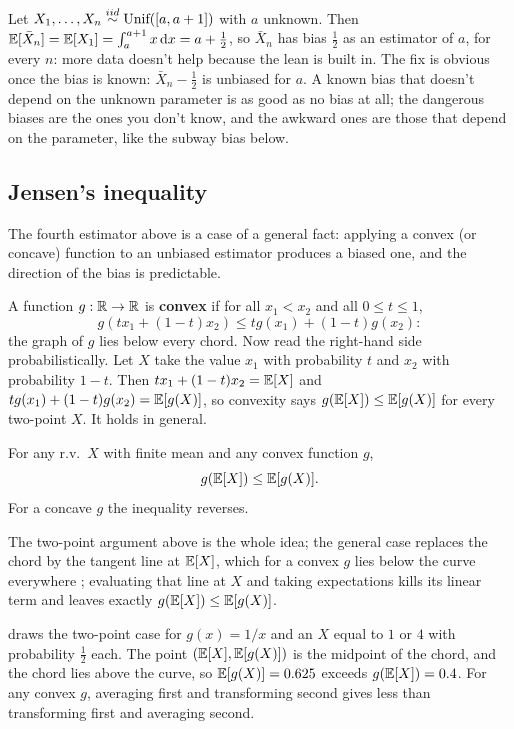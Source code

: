 \begin{worked}
Let $X_1, \ldots, X_n \stackrel{iid}{\sim} \text{Unif}([a, a+1])$ with $a$ unknown.
Then $\operatorname*{\mathbb{E}}[\bar{X}_n] = \operatorname*{\mathbb{E}}[X_1] = \int_a^{a+1} x \, \mathrm{d}x = a + \frac12$, so $\bar{X}_n$ has bias $\frac12$ as an estimator of $a$, for every $n$: more data doesn't help because the lean is built in.
The fix is obvious once the bias is known: $\bar{X}_n - \frac12$ is unbiased for $a$.
A known bias that doesn't depend on the unknown parameter is as good as no bias at all; the dangerous biases are the ones you don't know, and the awkward ones are those that depend on the parameter, like the subway bias below.
\end{worked}

\subsection{Jensen's inequality}

The fourth estimator above is a case of a general fact: applying a convex (or concave) function to an unbiased estimator produces a biased one, and the direction of the bias is predictable.

A function $g: \mathbb{R} \to \mathbb{R}$ is \textbf{convex} if for all $x_1 < x_2$ and all $0 \leq t \leq 1$,
\[
g(t x_1 + (1 - t) x_2) \leq t g(x_1) + (1 - t) g(x_2):
\]
the graph of $g$ lies below every chord.
Now read the right-hand side probabilistically.
Let $X$ take the value $x_1$ with probability $t$ and $x_2$ with probability $1 - t$.
Then $t x_1 + (1-t) x_2 = \operatorname*{\mathbb{E}}[X]$ and $t g(x_1) + (1-t) g(x_2) = \operatorname*{\mathbb{E}}[g(X)]$, so convexity says $g(\operatorname*{\mathbb{E}}[X]) \leq \operatorname*{\mathbb{E}}[g(X)]$ for every two-point $X$.
It holds in general.

\begin{theorem}
\label{thm:jensen}
For any r.v.\ $X$ with finite mean and any convex function $g$,
\[
g(\operatorname*{\mathbb{E}}[X]) \leq \operatorname*{\mathbb{E}}[g(X)].
\]
For a concave $g$ the inequality reverses.
\end{theorem}
The two-point argument above is the whole idea; the general case replaces the chord by the tangent line at $\operatorname*{\mathbb{E}}[X]$, which for a convex $g$ lies below the curve everywhere ; evaluating that line at $X$ and taking expectations kills its linear term and leaves exactly $g(\operatorname*{\mathbb{E}}[X]) \leq \operatorname*{\mathbb{E}}[g(X)]$.

 draws the two-point case for $g(x) = 1/x$ and an $X$ equal to $1$ or $4$ with probability $\frac12$ each.
The point $(\operatorname*{\mathbb{E}}[X], \operatorname*{\mathbb{E}}[g(X)])$ is the midpoint of the chord, and the chord lies above the curve, so $\operatorname*{\mathbb{E}}[g(X)] = 0.625$ exceeds $g(\operatorname*{\mathbb{E}}[X]) = 0.4$.
For any convex $g$, averaging first and transforming second gives less than transforming first and averaging second.

